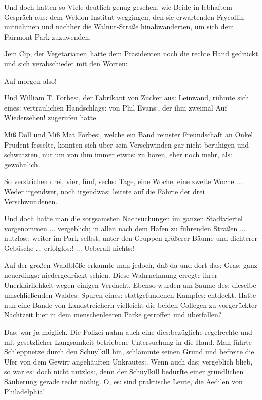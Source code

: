 \documentclass[oneside,12pt]{book}
\newcommand{\s}{s:}
\begin{document}
Und doch hatten so Viele deutlich genug gesehen, wie Beide in
lebhaftem Gespr\"ach au{\s} dem Weldon-Institut weggingen, den sie
erwartenden Frycollin mitnahmen und nachher die Walnut-Stra{\ss}e
hinabwanderten, um sich dem Fairmont-Park zuzuwenden.

Jem Cip, der Vegetarianer, hatte dem Pr\"asidenten noch die rechte
Hand gedr\"uckt und sich verabschiedet mit den Worten:

{\glqq}Auf morgen also!{\grqq}

Und William T. Forbe{\s}, der Fabrikant von Zucker au{\s} Leinwand,
r\"uhmte sich eine{\s} vertraulichen Handschlag{\s} von Phil
Evan{\s}, der ihm zweimal {\glqq}Auf Wiedersehen!{\grqq} zugerufen
hatte.

Mi{\ss} Doll und Mi{\ss} Mat Forbe{\s}, welche ein Band reinster
Freundschaft an Onkel Prudent fesselte, konnten sich \"uber sein
Verschwinden gar nicht beruhigen und schwatzten, nur um von ihm immer
etwa{\s} zu h\"oren, eher noch mehr, al{\s} gew\"ohnlich.

So verstrichen drei, vier, f\"unf, sech{\s} Tage, eine Woche, eine
zweite Woche ... Weder irgendwer, noch irgendwa{\s} leitete auf die
F\"ahrte der drei Verschwundenen.

Und doch hatte man die sorgsamsten Nachsuchungen im ganzen
Stadtviertel vorgenommen ... vergeblich; in allen nach dem Hafen zu
f\"uhrenden Stra{\ss}en ... nutzlo{\s}; weiter im Park selbst, unter
den Gruppen gr\"o{\ss}erer B\"aume und dichterer Geb\"usche ...
erfolglo{\s}! ... Ueberall nicht{\s}!

Auf der gro{\ss}en Waldbl\"o{\ss}e erkannte man jedoch, da{\ss} da
und dort da{\s} Gra{\s} ganz neuerding{\s} niedergedr\"uckt schien.
Diese Wahrnehmung erregte ihrer Unerkl\"arlichkeit wegen einigen
Verdacht. Ebenso wurden am Saume de{\s} dieselbe umschlie{\ss}enden
Walde{\s} Spuren eine{\s} stattgefundenen Kampfe{\s} entdeckt. Hatte
nun eine Bande von Landstreichern vielleicht die beiden Collegen zu
vorger\"uckter Nacht\/zeit hier in dem menschenleeren Parke getroffen
und \"uberfallen?

Da{\s} war ja m\"oglich. Die Polizei nahm auch eine
die{\s}bez\"ugliche regelrechte und mit gesetzlicher Langsamkeit
betriebene Untersuchung in die Hand. Man f\"uhrte Schleppnetze durch
den Schuylkill hin, schl\"ammte seinen Grund und befreite die Ufer
von dem Gewirr angeh\"auften Unkraute{\s}. Wenn auch da{\s}
vergeblich blieb, so war e{\s} doch nicht nutzlo{\s}, denn der
Schuylkill bedurfte einer gr\"undlichen S\"auberung gerade recht
n\"othig. O, e{\s} sind praktische Leute, die Aedilen von
Philadelphia!
\end{document}
